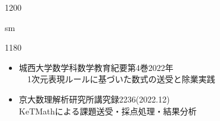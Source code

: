 \documentclass[landscape,10pt]{ujarticle}
\newcommand{\slidepage}[1][s]{%
\setcounter{ketpicctra}{18}%
\if#1m \setcounter{ketpicctra}{1}\fi
\hypersetup{linkcolor=black}%

\begin{layer}{118}{0}
\putnotee{122}{-\theketpicctra.05}{\small\thepage/\pageref{pageend}}
\end{layer}\hypersetup{linkcolor=blue}

}
\newcommand{\hiduke}{0304}
\begin{document}
\begin{layer}{120}{0}
\end{layer}

\def\mainslidetitley{22}
\def\ketcletter{slidecolora}
\def\ketcbox{slidecolorb}
\def\ketdbox{slidecolorc}
\def\ketcframe{slidecolord}
\def\ketcshadow{slidecolore}
\def\ketdshadow{slidecolorf}
\def\slidetitlex{6}
\def\slidetitlesize{1.3}
\def\mketcletter{slidecolori}
\def\mketcbox{yellow}
\def\mketdbox{yellow}
\def\mketcframe{yellow}
\def\mslidetitlex{62}
\def\mslidetitlesize{2}

\color{black}
\Large\bf\boldmath
\addtocounter{page}{-1}

\def\MARU{}
\renewcommand{\MARU}[1]{{\ooalign{\hfil$#1$\/\hfil\crcr\raise.167ex\hbox{\mathhexbox20D}}}}
\renewcommand{\slidepage}[1][s]{%
\setcounter{ketpicctra}{18}%
\if#1m \setcounter{ketpicctra}{1}\fi
\hypersetup{linkcolor=black}%
\begin{layer}{118}{0}
\putnotee{115}{-\theketpicctra.05}{\small\hiduke-\thepage/\pageref{pageend}}
\end{layer}\hypersetup{linkcolor=blue}
}
\setcounter{ban}{1}
\newcommand{\monban}[1][\hiduke]{%
#1-\theban\ %
\addtocounter{ban}{1}%
}
\newcommand{\monbannoadd}[1][\hiduke]{%
#1-\theban\ %
}
\newcommand{\addban}{%
\addtocounter{ban}{1}%
}
\newcommand{\seteda}[1]{%
\setcounter{edawidth}{#1}
\setcounter{edactr}{1}
}
\newcommand{\eda}[2][\theedawidth]{%
\Ltab{#1 mm}{[\theedactr]\ #2}%
\addtocounter{edactr}{1}%
}



\vspace*{18mm}

\slidepage
\begin{itemize}
\item
城西大学数学科数学教育紀要第4巻2022年\\
　1次元表現ルールに基づいた数式の送受と除業実践\\
\item
京大数理解析研究所講究録2236(2022.12)\\
KeTMathによる課題送受・採点処理・結果分析\\
\end{itemize}
\end{document}
